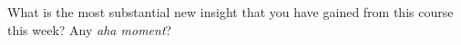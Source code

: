 \documentclass[10pt,letterpaper]{scrartcl}
\begin{document}
\vspace*{3mm}
\hrulefill

\vspace*{3mm}
\hrulefill

\vspace*{3mm}
\hrulefill

What is the most substantial new insight that you have gained from this course this week? Any \emph{aha moment}?

\vspace*{3mm}
\hrulefill

\vspace*{3mm}
\hrulefill

\vspace*{3mm}
\hrulefill
\end{document}
